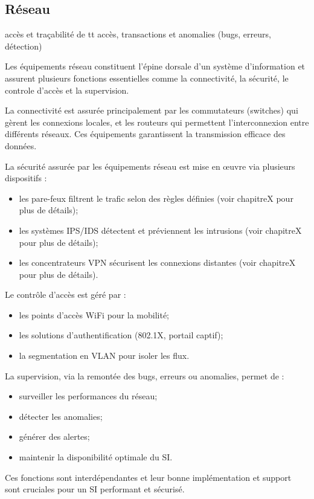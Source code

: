 \subsection{Réseau}
accès et traçabilité de tt accès, transactions et anomalies (bugs, erreurs, détection)

Les équipements réseau constituent l'épine dorsale d'un système d'information et assurent plusieurs fonctions essentielles comme la connectivité, la sécurité, le controle d'accès et la supervision.

La connectivité est assurée principalement par les commutateurs (switches) qui gèrent les connexions locales, et les routeurs qui permettent l'interconnexion entre différents réseaux. Ces équipements garantissent la transmission efficace des données.

La sécurité assurée par les équipements réseau est mise en œuvre via plusieurs dispositifs :
\begin{itemize}
    \item les pare-feux filtrent le trafic selon des règles définies (voir chapitreX pour plus de détails);
    \item les systèmes IPS/IDS détectent et préviennent les intrusions (voir chapitreX pour plus de détails);
    \item les concentrateurs VPN sécurisent les connexions distantes (voir chapitreX pour plus de détails).
\end{itemize}

Le contrôle d'accès est géré par :
\begin{itemize}
    \item les points d'accès WiFi pour la mobilité;
    \item les solutions d'authentification (802.1X, portail captif);
    \item la segmentation en VLAN pour isoler les flux.
\end{itemize}

La supervision, via la remontée des bugs, erreurs ou anomalies, permet de :
\begin{itemize}
    \item surveiller les performances du réseau;
    \item détecter les anomalies;
    \item générer des alertes;
    \item maintenir la disponibilité optimale du SI.
\end{itemize}

Ces fonctions sont interdépendantes et leur bonne implémentation et support sont cruciales pour un SI performant et sécurisé.

